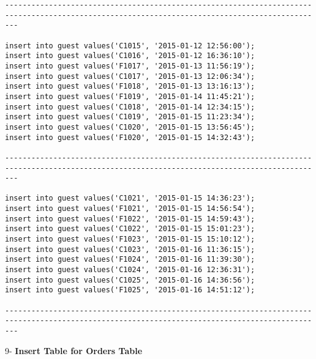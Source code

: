 \documentclass[a4,12pt]{report}
\begin{document}
\begin{lstlisting}
-----------------------------------------------------------------------------------------------------------------------------------------------

insert into guest values('C1015', '2015-01-12 12:56:00');
insert into guest values('C1016', '2015-01-12 16:36:10');
insert into guest values('F1017', '2015-01-13 11:56:19');
insert into guest values('C1017', '2015-01-13 12:06:34');
insert into guest values('F1018', '2015-01-13 13:16:13');
insert into guest values('F1019', '2015-01-14 11:45:21');
insert into guest values('C1018', '2015-01-14 12:34:15');
insert into guest values('C1019', '2015-01-15 11:23:34');
insert into guest values('C1020', '2015-01-15 13:56:45');
insert into guest values('F1020', '2015-01-15 14:32:43');

-----------------------------------------------------------------------------------------------------------------------------------------------

insert into guest values('C1021', '2015-01-15 14:36:23');
insert into guest values('F1021', '2015-01-15 14:56:54');
insert into guest values('F1022', '2015-01-15 14:59:43');
insert into guest values('C1022', '2015-01-15 15:01:23');
insert into guest values('F1023', '2015-01-15 15:10:12');
insert into guest values('C1023', '2015-01-16 11:36:15');
insert into guest values('F1024', '2015-01-16 11:39:30');
insert into guest values('C1024', '2015-01-16 12:36:31');
insert into guest values('C1025', '2015-01-16 14:36:56');
insert into guest values('F1025', '2015-01-16 14:51:12');

-----------------------------------------------------------------------------------------------------------------------------------------------

\end{lstlisting}

\begin{flushleft}
 9- \textbf{ Insert Table for Orders Table}
\end{flushleft}
\end{document}
